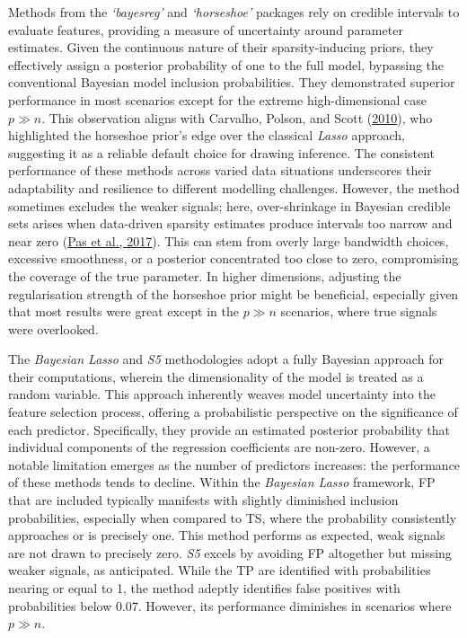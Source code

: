\documentclass[
  11pt,
]{article}
\begin{document}
Methods from the \emph{`bayesreg'} and \emph{`horseshoe'} packages rely
on credible intervals to evaluate features, providing a measure of
uncertainty around parameter estimates. Given the continuous nature of
their sparsity-inducing priors, they effectively assign a posterior
probability of one to the full model, bypassing the conventional
Bayesian model inclusion probabilities. They demonstrated superior
performance in most scenarios except for the extreme high-dimensional
case \(p \gg n\). This observation aligns with Carvalho, Polson, and
Scott (\protect\hyperlink{ref-Carvalho2010}{2010}), who highlighted the
horseshoe prior's edge over the classical \emph{Lasso} approach,
suggesting it as a reliable default choice for drawing inference. The
consistent performance of these methods across varied data situations
underscores their adaptability and resilience to different modelling
challenges. However, the method sometimes excludes the weaker signals;
here, over-shrinkage in Bayesian credible sets arises when data-driven
sparsity estimates produce intervals too narrow and near zero
(\protect\hyperlink{ref-Pas2017}{Pas et al., 2017}). This can stem from
overly large bandwidth choices, excessive smoothness, or a posterior
concentrated too close to zero, compromising the coverage of the true
parameter. In higher dimensions, adjusting the regularisation strength
of the horseshoe prior might be beneficial, especially given that most
results were great except in the \(p \gg n\) scenarios, where true
signals were overlooked.

The \emph{Bayesian Lasso} and \emph{S5} methodologies adopt a fully
Bayesian approach for their computations, wherein the dimensionality of
the model is treated as a random variable. This approach inherently
weaves model uncertainty into the feature selection process, offering a
probabilistic perspective on the significance of each predictor.
Specifically, they provide an estimated posterior probability that
individual components of the regression coefficients are non-zero.
However, a notable limitation emerges as the number of predictors
increases: the performance of these methods tends to decline. Within the
\emph{Bayesian Lasso} framework, FP that are included typically
manifests with slightly diminished inclusion probabilities, especially
when compared to TS, where the probability consistently approaches or is
precisely one. This method performs as expected, weak signals are not
drawn to precisely zero. \emph{S5} excels by avoiding FP altogether but
missing weaker signals, as anticipated. While the TP are identified with
probabilities nearing or equal to 1, the method adeptly identifies false
positives with probabilities below 0.07. However, its performance
diminishes in scenarios where \(p \gg n\).
\end{document}
